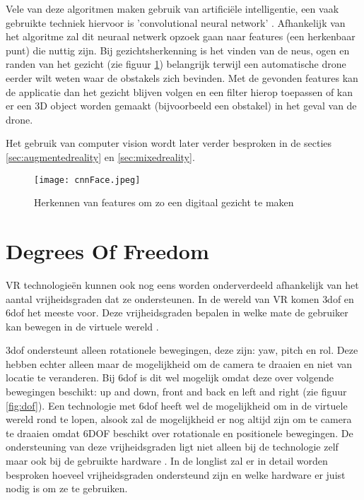 Vele van deze algoritmen maken gebruik van artificiële intelligentie, een vaak gebruikte techniek hiervoor is 'convolutional neural network' \autocite{Ji2013}. Afhankelijk van het algoritme zal dit neuraal netwerk opzoek gaan naar features (een herkenbaar punt) die nuttig zijn. Bij gezichtsherkenning is het vinden van de neus, ogen en randen van het gezicht (zie figuur \ref{fig:cnnface}) belangrijk terwijl een automatische drone eerder wilt weten waar de obstakels zich bevinden. Met de gevonden features kan de applicatie dan het gezicht blijven volgen en een filter hierop toepassen of kan er een 3D object worden gemaakt (bijvoorbeeld een obstakel) in het geval van de drone. 

Het gebruik van computer vision wordt later verder besproken in de secties \ref{sec:augmentedreality} en \ref{sec:mixedreality}.
\begin{figure}
    \texttt{[image: cnnFace.jpeg]}
    \caption{Herkennen van features om zo een digitaal gezicht te maken}
    \label{fig:cnnface}
\end{figure}

\section{Degrees Of Freedom}

VR technologieën kunnen ook nog eens worden onderverdeeld afhankelijk van het aantal vrijheidsgraden dat ze ondersteunen. In de wereld van VR komen \acrshort{3dof} en \acrshort{6dof} het meeste voor. Deze vrijheidsgraden bepalen in welke mate de gebruiker kan bewegen in de virtuele wereld \autocite{Chen1995}.

\acrshort{3dof} ondersteunt alleen rotationele bewegingen, deze zijn: yaw, pitch en rol. Deze hebben echter alleen maar de mogelijkheid om de camera te draaien en niet van locatie te veranderen. Bij \acrshort{6dof} is dit wel mogelijk omdat deze over volgende bewegingen beschikt: up and down, front and back en left and right (zie figuur \ref{fig:dof}).
Een technologie met \acrshort{6dof} heeft wel de mogelijkheid om in de virtuele wereld rond te lopen, alsook zal de mogelijkheid er nog altijd zijn om te camera te draaien omdat 6DOF beschikt over rotationale en positionele bewegingen. De ondersteuning van deze vrijheidsgraden ligt niet alleen bij de technologie zelf maar ook bij de gebruikte hardware \autocite{Chen1995}. In de longlist zal er in detail worden besproken hoeveel vrijheidsgraden ondersteund zijn en welke hardware er juist nodig is om ze te gebruiken.


